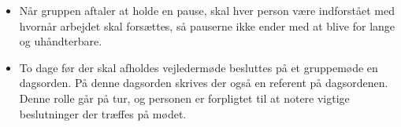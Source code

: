 \documentclass[hidelinks, 12pt]{article}
\begin{document}
\begin{itemize}
		\item Når gruppen aftaler at holde en pause, skal hver person være indforstået med hvornår arbejdet skal forsættes, så pauserne ikke ender med at blive for lange og uhåndterbare.
		\item To dage før der skal afholdes vejledermøde besluttes på et gruppemøde en dagsorden. På denne dagsorden skrives der også en referent på dagsordenen. Denne rolle går på tur, og personen er forpligtet til at notere vigtige beslutninger der træffes på mødet.    
	\end{itemize}
\end{document}
